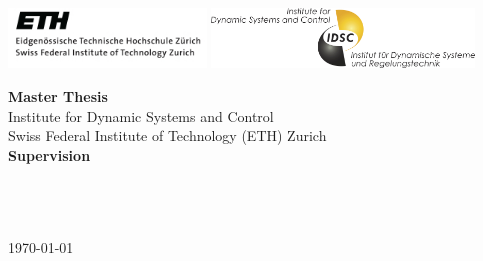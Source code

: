 \begin{titlepage}

\pagestyle{empty}
\begin{center}

\includegraphics[height=1.6cm]{logos/eth_logo}
\hfill
\includegraphics[height=1.6cm]{logos/idsc_logo}

\vspace*{2cm}
{\large \theauthor}
\vspace{2.5cm}

\begin{minipage}{15cm}
\centering
\bfseries \Huge {\thetitle} 
\end{minipage}
\vspace*{4cm}


{\large \textbf{Master Thesis}} \\[3ex]
Institute for Dynamic Systems and Control\\
Swiss Federal Institute of Technology (ETH) Zurich\\

\vspace{2cm}
\textbf{Supervision} \\[1.5ex]
\phdA \\
\phdB \\ 
\supervisorstanford \\ 
\supervisoreth

\vfill
\today

\end{center}

\cleardoublepage %
\end{titlepage}
